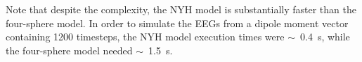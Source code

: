 \documentclass[preprint,10pt,authoryear]{elsarticle}
\newcommand{\hlp}[2][Purple]{ {\sethlcolor{#1} \hl{#2}} }
\newcommand{\sntxt}[1]{{\color{NavyBlue}#1}}
\newcommand{\tvntxt}[1]{{\color{Emerald}#1}}
\newcommand{\gen}[1]{\color{white}{\hlp{GTE: #1 }}\color{black}}
\begin{document}
Note that despite the complexity, the NYH model is substantially faster than the four-sphere model. In order to simulate the EEGs from a dipole moment vector containing 1200 timesteps, the NYH model execution times were \sntxt{$\sim$}~0.4~s, while the four-sphere model needed \sntxt{$\sim$}~1.5~s. %



%
%
\end{document}
